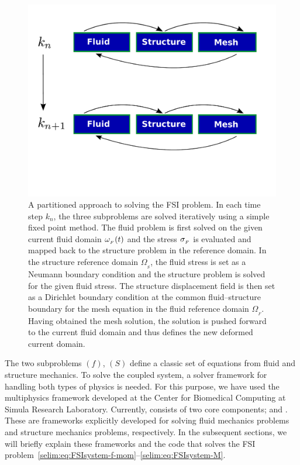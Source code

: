 \begin{figure}
\bwfig
  \centering
  \includegraphics[width=\largefig]{chapters/selim/pdf/primal.pdf}
  \caption{A partitioned approach to solving the FSI problem. In each
    time step $k_n$, the three subproblems are solved iteratively
    using a simple fixed point method. The fluid problem is first
    solved on the given current fluid domain $\omega_{_{F}}(t)$ and the stress
    $\sigma_{_{F}}$ is evaluated and mapped back to the
    structure problem in the reference domain. In the structure
    reference domain $\Omega_{_{S}}$, the fluid stress is set as a
    Neumann boundary condition and the structure problem is solved for the
    given fluid stress. The structure displacement field is then set
    as a Dirichlet boundary condition at the common fluid--structure
    boundary for the mesh equation in the fluid reference domain
    $\Omega_{_{F}}$. Having obtained the mesh solution, the solution
    is pushed forward to the current fluid domain and thus defines the
    new deformed current domain.}
  \label{selim:fig:fp}
  \vspace*{24pt}
\end{figure}


The two subproblems $(f)$, $(S)$ define a
classic set of equations from fluid and structure mechanics. To solve the
coupled system, a solver framework for handling both types of physics
is needed. For this purpose, we have used the multiphysics framework
 developed at the Center for Biomedical Computing at
Simula Research Laboratory. Currently,  consists of
two core components;  and .  These are
frameworks explicitly developed for solving fluid mechanics problems and
structure mechanics problems, respectively.  In the subsequent sections,
we will briefly explain these frameworks and the code that solves the
FSI problem~\eqref{selim:eq:FSIsystem-f-mom}--\eqref{selim:eq:FSIsystem-M}.


